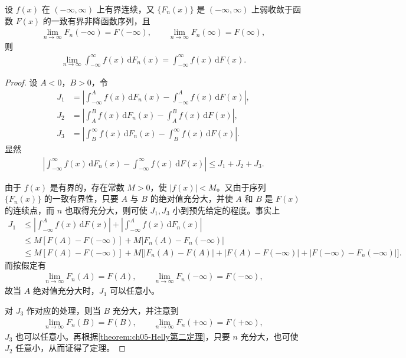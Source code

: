 \documentclass[../../main.tex]{subfiles}
\begin{document}
\begin{theorem}\label{theorem:ch05-拓广Helly第二定理}
设 $f(x)$ 在 $(-\infty,\infty)$ 上有界连续，又 $\{F_n(x)\}$ 是 $(-\infty,\infty)$ 上弱收敛于函数 $F(x)$ 的一致有界非降函数序列，且
\begin{align*}
\lim_{n\to\infty}F_n(-\infty)=F(-\infty),\qquad \lim_{n\to\infty}F_n(\infty)=F(\infty),
\end{align*}
则
\begin{align*}
\lim_{n\to\infty}\int_{-\infty}^{\infty}f(x)\,\mathrm{d}F_n(x)=\int_{-\infty}^{\infty}f(x)\,\mathrm{d}F(x).
\end{align*}
\end{theorem}

\begin{proof}
设 $A<0$，$B>0$，令
\begin{align*}
J_1&=\left|\int_{-\infty}^{A}f(x)\,\mathrm{d}F_n(x)-\int_{-\infty}^{A}f(x)\,\mathrm{d}F(x)\right|,\\
J_2&=\left|\int_{A}^{B}f(x)\,\mathrm{d}F_n(x)-\int_{A}^{B}f(x)\,\mathrm{d}F(x)\right|,\\
J_3&=\left|\int_{B}^{\infty}f(x)\,\mathrm{d}F_n(x)-\int_{B}^{\infty}f(x)\,\mathrm{d}F(x)\right|.
\end{align*}
显然
\begin{align*}
\left|\int_{-\infty}^{\infty}f(x)\,\mathrm{d}F_n(x)-\int_{-\infty}^{\infty}f(x)\,\mathrm{d}F(x)\right|\leqslant J_1+J_2+J_3.
\end{align*}

由于 $f(x)$ 是有界的，存在常数 $M>0$，使 $|f(x)|<M$。又由于序列 $\{F_n(x)\}$ 的一致有界性，只要 $A$ 与 $B$ 的绝对值充分大，并使 $A$ 和 $B$ 是 $F(x)$ 的连续点，而 $n$ 也取得充分大，则可使 $J_1,J_3$ 小到预先给定的程度。事实上
\begin{align*}
J_1&\leqslant\left|\int_{-\infty}^{A}f(x)\,\mathrm{d}F(x)\right|+\left|\int_{-\infty}^{A}f(x)\,\mathrm{d}F_n(x)\right|\\
&\leqslant M[F(A)-F(-\infty)]+M|F_n(A)-F_n(-\infty)|\\
&\leqslant M[F(A)-F(-\infty)]+M\bigl[|F_n(A)-F(A)|+|F(A)-F(-\infty)|+|F(-\infty)-F_n(-\infty)|\bigr].
\end{align*}
而按假定有
\begin{align*}
\lim_{n\to\infty}F_n(A)=F(A),\qquad \lim_{n\to\infty}F_n(-\infty)=F(-\infty),
\end{align*}
故当 $A$ 绝对值充分大时，$J_1$ 可以任意小。

对 $J_3$ 作对应的处理，则当 $B$ 充分大，并注意到
\begin{align*}
\lim_{n\to\infty}F_n(B)=F(B),\qquad \lim_{n\to\infty}F_n(+\infty)=F(+\infty),
\end{align*}
$J_3$ 也可以任意小。再根据\cref{theorem:ch05-Helly第二定理}，只要 $n$ 充分大，也可使 $J_2$ 任意小，从而证得了定理。
\end{proof}
\end{document}
